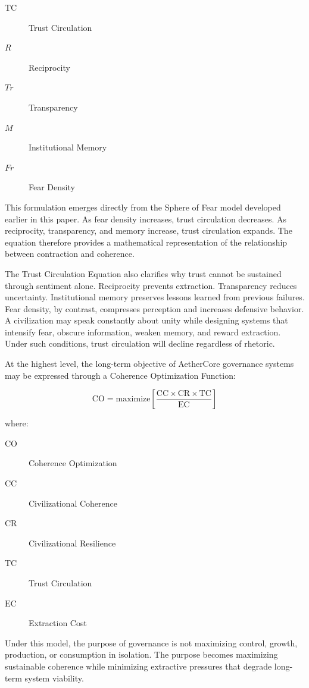 \documentclass[12pt]{article}
\begin{document}
\begin{description}
  \item[\(\mathrm{TC}\)] Trust Circulation
  \item[\(R\)] Reciprocity
  \item[\(Tr\)] Transparency
  \item[\(M\)] Institutional Memory
  \item[\(Fr\)] Fear Density
\end{description}

This formulation emerges directly from the Sphere of Fear model developed earlier in this paper. As fear density increases, trust circulation decreases. As reciprocity, transparency, and memory increase, trust circulation expands. The equation therefore provides a mathematical representation of the relationship between contraction and coherence.

The Trust Circulation Equation also clarifies why trust cannot be sustained through sentiment alone. Reciprocity prevents extraction. Transparency reduces uncertainty. Institutional memory preserves lessons learned from previous failures. Fear density, by contrast, compresses perception and increases defensive behavior. A civilization may speak constantly about unity while designing systems that intensify fear, obscure information, weaken memory, and reward extraction. Under such conditions, trust circulation will decline regardless of rhetoric.

At the highest level, the long-term objective of AetherCore governance systems may be expressed through a Coherence Optimization Function:

\[
\mathrm{CO}=\mathrm{maximize}\left[\frac{\mathrm{CC}\times \mathrm{CR}\times \mathrm{TC}}{\mathrm{EC}}\right]
\]

where:

\begin{description}
  \item[\(\mathrm{CO}\)] Coherence Optimization
  \item[\(\mathrm{CC}\)] Civilizational Coherence
  \item[\(\mathrm{CR}\)] Civilizational Resilience
  \item[\(\mathrm{TC}\)] Trust Circulation
  \item[\(\mathrm{EC}\)] Extraction Cost
\end{description}

Under this model, the purpose of governance is not maximizing control, growth, production, or consumption in isolation. The purpose becomes maximizing sustainable coherence while minimizing extractive pressures that degrade long-term system viability.
\end{document}
